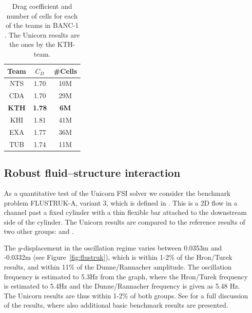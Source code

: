 \begin{table}
\begin{center}
\begin{tabular}{|c|cc|}
\hline
Team & $C_D$ & \#Cells \\
\hline
NTS &    1.70 &    10M \\
CDA  &   1.70  &   29M \\
\textbf{KTH}  &   \textbf{1.78}  &   \textbf{6M}\\
KHI  &   1.81  &   41M \\
EXA  &   1.77  &   36M \\
TUB  &   1.74  &   11M \\
\hline
\end{tabular}
\caption{Drag coefficient and number of cells
for each of the teams in BANC-1 \citep{SpalartMejia2011}. The Unicorn
results are the ones by the KTH-team.}
\end{center}
\label{tab:hoffman-1-rlg}
\end{table}

\subsection{Robust fluid--structure interaction}

As a quantitative test of the Unicorn FSI solver we consider
the benchmark problem FLUSTRUK-A, variant 3, which is defined in
\citet{HronTurek2005}. This is a 2D flow in a channel past a fixed
cylinder with a thin flexible bar attached to the downstream side of the
cylinder. The Unicorn results are compared to the reference results of
two other groups: \citet{HronTurek2005} and \citet{DunneRannacher2006}.

The $y$-displacement in the oscillation regime varies between 0.0353m and
-0.0332m (see Figure~\ref{fig:flustruk}), which is within 1-2\% of the
Hron/Turek results, and within 11\% of the Dunne/Rannacher amplitude. The
oscillation frequency is estimated to 5.3Hz from the graph, where the
Hron/Turek frequency is estimated to 5.4Hz and the Dunne/Rannacher
frequency is given as 5.48 Hz. The Unicorn results are thus within
1-2\% of both groups. See \citet{HoffmanJanssonStockli2011} for a full
discussion of the results, where also additional basic benchmark results
are presented.

